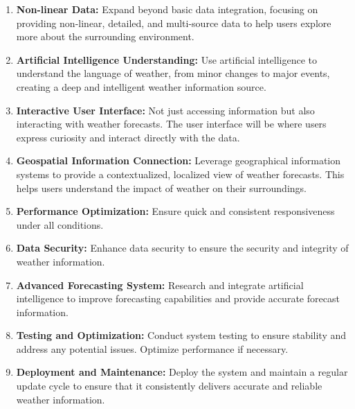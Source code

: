 \begin{enumerate}
    \item \textbf{Non-linear Data:} Expand beyond basic data integration, focusing on providing non-linear, detailed, and multi-source data to help users explore more about the surrounding environment.
    \item \textbf{Artificial Intelligence Understanding:} Use artificial intelligence to understand the language of weather, from minor changes to major events, creating a deep and intelligent weather information source.
    \item \textbf{Interactive User Interface:} Not just accessing information but also interacting with weather forecasts. The user interface will be where users express curiosity and interact directly with the data.
    \item \textbf{Geospatial Information Connection:} Leverage geographical information systems to provide a contextualized, localized view of weather forecasts. This helps users understand the impact of weather on their surroundings.
    \item \textbf{Performance Optimization:} Ensure quick and consistent responsiveness under all conditions.
    \item \textbf{Data Security:} Enhance data security to ensure the security and integrity of weather information.
    \item \textbf{Advanced Forecasting System:} Research and integrate artificial intelligence to improve forecasting capabilities and provide accurate forecast information.
    \item \textbf{Testing and Optimization:} Conduct system testing to ensure stability and address any potential issues. Optimize performance if necessary.
    \item \textbf{Deployment and Maintenance:} Deploy the system and maintain a regular update cycle to ensure that it consistently delivers accurate and reliable weather information.
\end{enumerate}